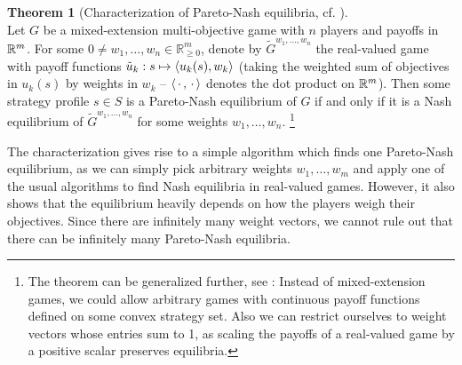 \documentclass[a4paper,DIV=11]{scrreprt}
\newcommand{\Rp}{\mathbb{R}_{\geq 0}}
\theoremstyle{definition}
\newtheorem{thm}{Theorem}[chapter] %
\begin{document}
    \begin{thm}[Characterization of Pareto-Nash equilibria, cf. \cite{bib:shapleyMultiobjectiveEquilibriumPoints,bib:paretoNashEquilibria}]~\\
        Let $G$ be a mixed-extension multi-objective game with $n$ players and payoffs in $\mathbb{R}^m$. 
        For some $0 \neq w_1, \dots, w_n \in \Rp^m$, denote by $\tilde{G}^{w_1, \dots, w_n}$ the real-valued game with payoff functions
        $\tilde{u}_k: s \mapsto \left\langle u_k(s), w_k \right\rangle$ (taking the weighted sum of objectives in $u_k(s)$ by weights in $w_k$ -- $\left\langle \,\cdot\,, \,\cdot\, \right\rangle$ denotes the dot product on $\mathbb{R}^m$).
        Then some strategy profile $s \in S$ is a Pareto-Nash equilibrium of $G$ if and only if it is a Nash equilibrium of $\tilde{G}^{w_1, \dots, w_n}$ for some weights $w_1, \dots, w_n$.
        \footnote{The theorem can be generalized further, see \cite{bib:shapleyMultiobjectiveEquilibriumPoints,bib:paretoNashEquilibria}: Instead of mixed-extension games, we could allow arbitrary games with continuous payoff functions defined on some convex strategy set.
        Also we can restrict ourselves to weight vectors whose entries sum to 1, as scaling the payoffs of a real-valued game by a positive scalar preserves equilibria.
        }
        \label{thm:paretoNashEquilibriaWeightingCharacterization}
    \end{thm}

    The characterization gives rise to a simple algorithm which finds one Pareto-Nash equilibrium, as we can simply pick arbitrary weights $w_1, \dots, w_m$ and apply one of the usual algorithms to find Nash equilibria in real-valued games.
    However, it also shows that the equilibrium heavily depends on how the players weigh their objectives. Since there are infinitely many weight vectors, we cannot rule out that there can be infinitely many Pareto-Nash equilibria. 
    
\end{document}
